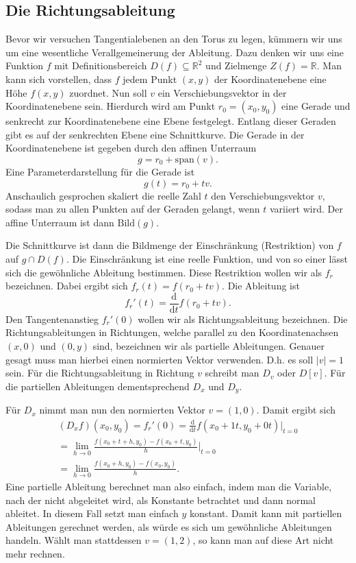 \documentclass[a4paper,12pt,fleqn]{article}
\begin{document}
\subsection{Die Richtungsableitung}
Bevor wir versuchen Tangentialebenen an den Torus zu legen, kümmern
wir uns um eine wesentliche Verallgemeinerung der Ableitung. Dazu
denken wir uns eine Funktion $f$ mit Definitionsbereich
$D(f)\subseteq\mathbb R^2$ und Zielmenge $Z(f)=\mathbb R$.
Man kann sich vorstellen, dass $f$ jedem Punkt $(x,y)$ der
Koordinatenebene eine Höhe $f(x,y)$ zuordnet. Nun soll $v$ ein
Verschiebungsvektor in der Koordinatenebene sein. Hierdurch
wird am Punkt $r_0=(x_0,y_0)$ eine Gerade und senkrecht zur
Koordinatenebene eine Ebene festgelegt. Entlang dieser
Geraden gibt es auf der senkrechten Ebene eine Schnittkurve.
Die Gerade in der Koordinatenebene ist gegeben durch
den affinen Unterraum
\begin{equation}
g = r_0+\mathrm{span}(v).
\end{equation}
Eine Parameterdarstellung für die Gerade ist
\begin{equation}
g(t) = r_0+tv.
\end{equation}
Anschaulich gesprochen skaliert die reelle Zahl $t$ den
Verschiebungsvektor $v$, sodass man zu allen Punkten auf der
Geraden gelangt, wenn $t$ variiert wird.
Der affine Unterraum ist dann $\mathrm{Bild}(g)$.

Die Schnittkurve ist dann die Bildmenge der Einschränkung
(Restriktion) von $f$ auf $g\cap D(f)$. Die Einschränkung
ist eine reelle Funktion, und von so einer lässt sich die
gewöhnliche Ableitung bestimmen. Diese Restriktion wollen wir
als $f_r$ bezeichnen. Dabei ergibt sich
$f_r(t) = f(r_0+tv)$.
Die Ableitung ist
\begin{equation}\label{Restriktion}
f_r'(t) = \frac{\mathrm d}{\mathrm dt} f(r_0+tv).
\end{equation}
Den Tangentenanstieg $f_r'(0)$ wollen wir als Richtungsableitung
bezeichnen. Die Richtungsableitungen in Richtungen, welche
parallel zu den Koordinatenachsen $(x,0)$ und $(0,y)$ sind,
bezeichnen wir als partielle Ableitungen. Genauer gesagt muss man
hierbei einen normierten Vektor verwenden. D.h. es soll $|v|=1$ sein.
Für die Richtungsableitung in Richtung $v$ schreibt man $D_v$ oder
$D[v]$. Für die partiellen Ableitungen dementsprechend
$D_x$ und $D_y$.

Für $D_x$ nimmt man nun den normierten Vektor $v=(1,0)$.
Damit ergibt sich
\begin{gather*}
(D_x f)(x_0,y_0) = f_r'(0)
= \frac{\mathrm d}{\mathrm dt} f(x_0+1t,y_0+0t)\Big|_{t=0}\\
= \lim_{h\rightarrow 0} \frac{f(x_0+t+h,y_0)-f(x_0+t,y_0)}{h}\Big|_{t=0}\\
= \lim_{h\rightarrow 0} \frac{f(x_0+h,y_0)-f(x_0,y_0)}{h}.
\end{gather*}
Eine partielle Ableitung berechnet man also einfach, indem man
die Variable, nach der nicht abgeleitet wird, als Konstante
betrachtet und dann normal ableitet. In diesem Fall setzt man einfach
$y$ konstant. Damit kann mit partiellen Ableitungen gerechnet werden,
als würde es sich um gewöhnliche Ableitungen handeln. Wählt man
stattdessen $v=(1,2)$, so kann man auf diese Art nicht mehr
rechnen.
\end{document}
